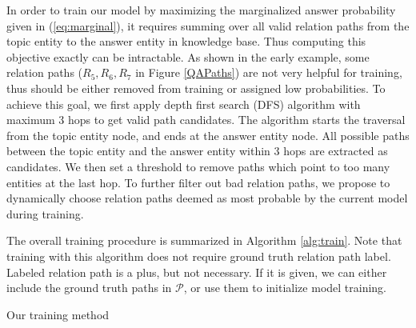 In order to train our model by maximizing the marginalized answer probability given in (\ref{eq:marginal}), it requires summing over all valid relation paths from the topic entity to the answer entity in knowledge base. Thus computing this objective exactly can be intractable. As shown in the early example, some relation paths ($R_5, R_6, R_7$ in Figure \ref{QAPaths}) are not very helpful for training, thus should be either removed from training or assigned low probabilities. To achieve this goal, we first apply depth first search (DFS) algorithm with maximum 3 hops to get valid path candidates. The algorithm starts the traversal from the topic entity node, and ends at the answer entity node. All possible paths between the topic entity and the answer entity within 3 hops are extracted as candidates. We then set a threshold to remove paths which point to too many entities at the last hop. To further filter out bad relation paths, we propose to dynamically choose relation paths deemed as most probable by the current model during training.


 The overall training procedure is summarized in Algorithm \ref{alg:train}. Note that training with this algorithm does not require ground truth relation path label. Labeled relation path is a plus, but not necessary. If it is given, we can either include the ground truth paths in $\mathcal{P}$, or use them to initialize model training.

\begin{algorithm}

 
 \ForEach {batch}{
  \ForEach{$(q^{n},y^{n}, e_0^{n})$ in the batch}{
  Get top $k_2$ paths in $\mathcal{P}$ sorted by $p(\mathbf{p}|q)$ based on current model:
		 	$\tilde{\mathcal{P}}^n = \{{\mathbf{p}}^n_{1},\cdots,{\mathbf{p}}^n_{k_2} \}$\\
  } 
    Update model parameters by maximizing $\sum\limits_{(q^{n},y^{n}, e_0^{n}) \in \text{batch}} \log \sum\limits_{\mathbf{p} \in \tilde{\mathcal{P}}^n} p(y^{n}|\mathbf{p},q^{n}) P(\mathbf{p}|q^{n}) $
  }


 \caption{Our training method}
 \label{alg:train}
\end{algorithm}
